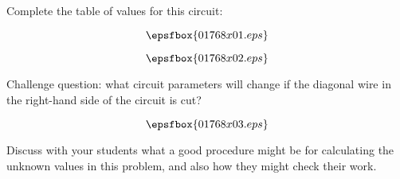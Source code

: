 

Complete the table of values for this circuit:

$$\epsfbox{01768x01.eps}$$







$$\epsfbox{01768x02.eps}$$

Challenge question: what circuit parameters will change if the diagonal wire in the right-hand side of the circuit is cut?

$$\epsfbox{01768x03.eps}$$







Discuss with your students what a good procedure might be for calculating the unknown values in this problem, and also how they might check their work.




